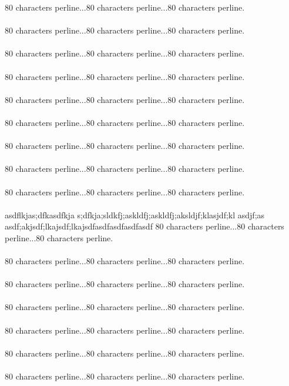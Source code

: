 {{{{80 characters perline...80 characters perline...80 characters perline.\asdf\\\\
80 characters perline...80 characters perline...80 characters perline.\asdf\\\\
80 characters perline...80 characters perline...80 characters perline.\asdf\\\\
80 characters perline...80 characters perline...80 characters perline.\asdf\\\\
80 characters perline...80 characters perline...80 characters perline.\asdf\\\\
80 characters perline...80 characters perline...80 characters perline.\asdf\\\\
80 characters perline...80 characters perline...80 characters perline.\asdf\\\\
80 characters perline...80 characters perline...80 characters perline.\asdf\\\\
80 characters perline...80 characters perline...80 characters perline.\asdf\\\\
asdflkjas;dfkasdfkja s;dfkja;sldkfj;askldfj;askldfj;aksldjf;klasjdf;kl asdjf;as
asdf;akjsdf;lkajsdf;lkajsdfasdfasdfasdfasdf
80 characters perline...80 characters perline...80 characters perline.\asdf\\\\
80 characters perline...80 characters perline...80 characters perline.\asdf\\\\
80 characters perline...80 characters perline...80 characters perline.\asdf\\\\
80 characters perline...80 characters perline...80 characters perline.\asdf\\\\
80 characters perline...80 characters perline...80 characters perline.\asdf\\\\
80 characters perline...80 characters perline...80 characters perline.\asdf\\\\
80 characters perline...80 characters perline...80 characters perline.\asdf\\\\
}}}}
